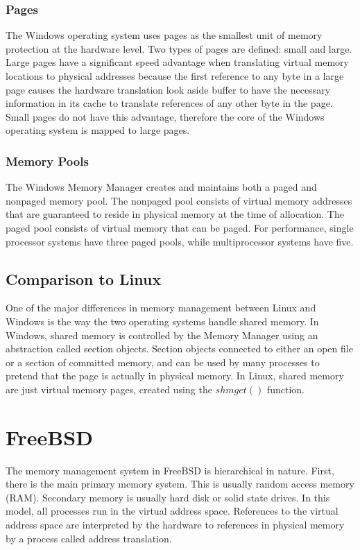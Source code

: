 \documentclass[letterpaper,draftclsnofoot,10pt,onecolumn,titlepage]{IEEEtran}\usepackage[margin=0.75in]{geometry}
\begin{document}
\subsubsection{Pages}
The Windows operating system uses pages as the smallest unit of memory protection at the hardware level.
Two types of pages are defined: small and large. Large pages have a significant speed advantage when 
translating virtual memory locations to physical addresses because the first reference to any byte in a 
large page causes the hardware translation look aside buffer to have the necessary information in its 
cache to translate references of any other byte in the page. Small pages do not have this advantage,
therefore the core of the Windows operating system is mapped to large pages.

\subsubsection{Memory Pools}
The Windows Memory Manager creates and maintains both a paged and nonpaged memory pool. The nonpaged 
pool consists of virtual memory addresses that are guaranteed to reside in physical memory at the 
time of allocation. The paged pool consists of virtual memory that can be paged. For performance,
single processor systems have three paged pools, while multiprocessor systems have five.

\subsection{Comparison to Linux}
One of the major differences in memory management between Linux and Windows is the way the two 
operating systems handle shared memory. In Windows, shared memory is controlled by the Memory Manager
using an abstraction called section objects. Section objects connected to either an open file or a 
section of committed memory, and can be used by many processes to pretend that the page is actually
in physical memory. In Linux, shared memory are just virtual memory pages, created using the $shmget()$
function.


\section{FreeBSD}
The memory management system in FreeBSD is hierarchical in nature. First, there is the main primary memory system.
This is usually random access memory (RAM). Secondary memory is usually hard disk or solid state drives. In 
this model, all processes run in the virtual address space. References to the virtual address space are 
interpreted by the hardware to references in physical memory by a process called address translation.
\end{document}
